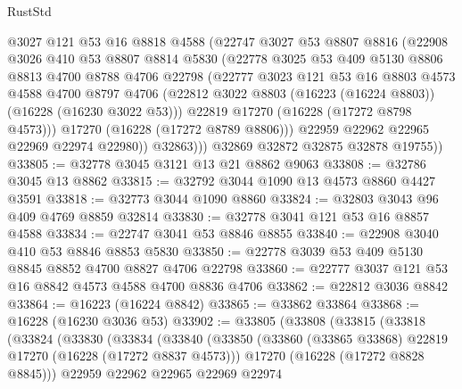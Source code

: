 \begin{lexlean}{RustStd}
\begin{coremodule}
              @3027
              @121
              @53
              @16
              @8818
              @4588
              (@22747
                @3027
                @53
                @8807
                @8816
                (@22908
                  @3026
                  @410
                  @53
                  @8807
                  @8814
                  @5830
                  (@22778
                    @3025
                    @53
                    @409
                    @5130
                    @8806
                    @8813
                    @4700
                    @8788
                    @4706
                    @22798
                    (@22777
                      @3023
                      @121
                      @53
                      @16
                      @8803
                      @4573
                      @4588
                      @4700
                      @8797
                      @4706
                      (@22812 @3022 @8803 (@16223 (@16224 @8803)) (@16228 (@16230 @3022 @53)))
                      @22819
                      @17270
                      (@16228 (@17272 @8798 @4573)))
                    @17270
                    (@16228 (@17272 @8789 @8806)))
                  @22959
                  @22962
                  @22965
                  @22969
                  @22974
                  @22980))
              @32863)))
        @32869
        @32872
        @32875
        @32878
        @19755))
@33805 := @32778 @3045 @3121 @13 @21 @8862 @9063
@33808 := @32786 @3045 @13 @8862
@33815 := @32792 @3044 @1090 @13 @4573 @8860 @4427 @3591
@33818 := @32773 @3044 @1090 @8860
@33824 := @32803 @3043 @96 @409 @4769 @8859 @32814
@33830 := @32778 @3041 @121 @53 @16 @8857 @4588
@33834 := @22747 @3041 @53 @8846 @8855
@33840 := @22908 @3040 @410 @53 @8846 @8853 @5830
@33850 := @22778 @3039 @53 @409 @5130 @8845 @8852 @4700 @8827 @4706 @22798
@33860 := @22777 @3037 @121 @53 @16 @8842 @4573 @4588 @4700 @8836 @4706
@33862 := @22812 @3036 @8842
@33864 := @16223 (@16224 @8842)
@33865 := @33862 @33864
@33868 := @16228 (@16230 @3036 @53)
@33902 := @33805
    (@33808
      (@33815
        (@33818
          (@33824
            (@33830
              (@33834
                (@33840
                  (@33850
                    (@33860 (@33865 @33868) @22819 @17270 (@16228 (@17272 @8837 @4573)))
                    @17270
                    (@16228 (@17272 @8828 @8845)))
                  @22959
                  @22962
                  @22965
                  @22969
                  @22974

\end{coremodule}
\end{lexlean}
